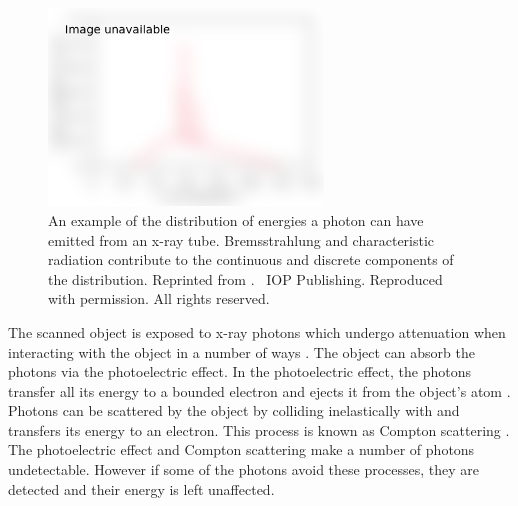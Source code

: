 \begin{figure}
  \centering
  \includegraphics[width=0.65\textwidth]{../figures/literatureReview/literature_spectrum.png}
  \caption{An example of the distribution of energies a photon can have emitted from an x-ray tube. Bremsstrahlung and characteristic radiation contribute to the continuous and discrete components of the distribution. Reprinted from \cite{michael2001x}. \textcopyright\ IOP Publishing. Reproduced with permission. All rights reserved.}
  \label{fig:literature_spectrum}
\end{figure}

The scanned object is exposed to x-ray photons which undergo attenuation when interacting with the object in a number of ways \citep{cantatore2011introduction}. The object can absorb the photons via the photoelectric effect. In the photoelectric effect, the photons transfer all its energy to a bounded electron and ejects it from the object's atom \citep{millikan1916direct}. Photons can be scattered by the object by colliding inelastically with and transfers its energy to an electron. This process is known as Compton scattering \citep{compton1923quantum}. The photoelectric effect and Compton scattering make a number of photons undetectable. However if some of the photons avoid these processes, they are detected and their energy is left unaffected.

